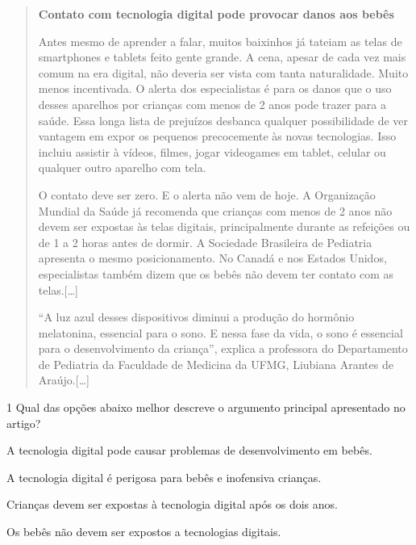 \begin{quote}
\centering\noindent\textbf{Contato com tecnologia digital pode provocar danos aos bebês﻿}\\
\medskip


\noindent Antes mesmo de aprender a falar, muitos baixinhos já tateiam as telas de
smartphones e tablets feito gente grande. A cena, apesar de cada vez
mais comum na era digital, não deveria ser vista com tanta naturalidade.
Muito menos incentivada. O alerta dos especialistas é para os danos que
o uso desses aparelhos por crianças com menos de 2 anos pode trazer para
a saúde. Essa longa lista de prejuízos desbanca qualquer possibilidade
de ver vantagem em expor os pequenos precocemente às novas tecnologias.
Isso incluiu assistir à vídeos, filmes, jogar videogames em tablet,
celular ou qualquer outro aparelho com tela.

O contato deve ser zero. E o alerta não vem de hoje. A Organização
Mundial da Saúde já recomenda que crianças com menos de 2 anos não devem
ser expostas às telas digitais, principalmente durante as refeições ou
de 1 a 2 horas antes de dormir. A Sociedade Brasileira de Pediatria
apresenta o mesmo posicionamento. No Canadá e nos Estados Unidos,
especialistas também dizem que os bebês não devem ter contato com as
telas.{[}\ldots{}{]}

``A luz azul desses dispositivos diminui a produção do hormônio
melatonina, essencial para o sono. E nessa fase da vida, o sono é
essencial para o desenvolvimento da criança'', explica a professora do
Departamento de Pediatria da Faculdade de Medicina da UFMG, Liubiana
Arantes de Araújo.{[}\ldots{}{]}

\end{quote}

\num{1} Qual das opções abaixo melhor descreve o argumento principal
apresentado no artigo?

\begin{escolha}
\item A tecnologia digital pode causar problemas de desenvolvimento em
bebês.
\item A tecnologia digital é perigosa para bebês e inofensiva crianças.
\item Crianças devem ser expostas à tecnologia digital após os dois anos.
\item Os bebês não devem ser expostos a tecnologias digitais.
\end{escolha}

